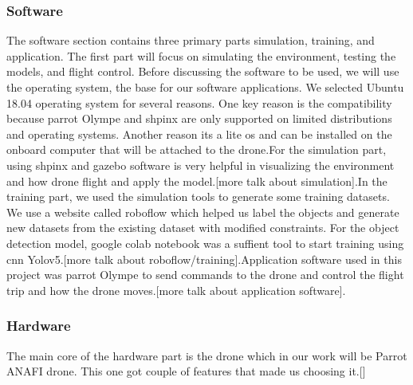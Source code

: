 \documentclass[../main.tex]{subfiles}
\begin{document}
\subsubsection{Software}
The software section contains three primary parts simulation, training, and application. The first part will focus on simulating the environment, testing the models, and flight control. Before discussing the software to be used, we will use the operating system, the base for our software applications. We selected Ubuntu 18.04 operating system for several reasons. One key reason is the compatibility because parrot Olympe and shpinx are only supported on limited distributions and operating systems. Another reason its a lite os and can be installed on the onboard computer that will be attached to the drone.For the simulation part, using shpinx and gazebo software is very helpful in visualizing the environment and how drone flight and apply the model.[more talk about simulation].In the training part, we used the simulation tools to generate some training datasets. We use a website called roboflow which helped us label the objects and generate new datasets from the existing dataset with modified constraints. For the object detection model, google colab notebook was a suffient tool to start training using \gls{cnn} Yolov5.[more talk about roboflow/training].Application software used in this project was parrot Olympe to send commands to the drone and control the flight trip and how the drone moves.[more talk about application software].


\subsubsection{Hardware}
The main core of the hardware part is the drone which in our work will be Parrot ANAFI drone. This one got couple of features that made us choosing it.[] 
\end{document}
